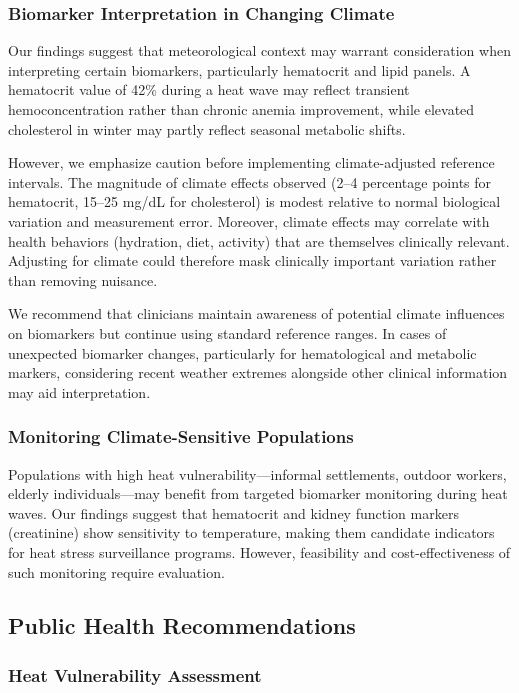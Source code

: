 \subsubsection{Biomarker Interpretation in Changing Climate}

Our findings suggest that meteorological context may warrant consideration when interpreting certain biomarkers, particularly hematocrit and lipid panels. A hematocrit value of 42\% during a heat wave may reflect transient hemoconcentration rather than chronic anemia improvement, while elevated cholesterol in winter may partly reflect seasonal metabolic shifts.

However, we emphasize caution before implementing climate-adjusted reference intervals. The magnitude of climate effects observed (2--4 percentage points for hematocrit, 15--25 mg/dL for cholesterol) is modest relative to normal biological variation and measurement error. Moreover, climate effects may correlate with health behaviors (hydration, diet, activity) that are themselves clinically relevant. Adjusting for climate could therefore mask clinically important variation rather than removing nuisance.

We recommend that clinicians maintain awareness of potential climate influences on biomarkers but continue using standard reference ranges. In cases of unexpected biomarker changes, particularly for hematological and metabolic markers, considering recent weather extremes alongside other clinical information may aid interpretation.

\subsubsection{Monitoring Climate-Sensitive Populations}

Populations with high heat vulnerability---informal settlements, outdoor workers, elderly individuals---may benefit from targeted biomarker monitoring during heat waves. Our findings suggest that hematocrit and kidney function markers (creatinine) show sensitivity to temperature, making them candidate indicators for heat stress surveillance programs. However, feasibility and cost-effectiveness of such monitoring require evaluation.

\subsection{Public Health Recommendations}

\subsubsection{Heat Vulnerability Assessment}

